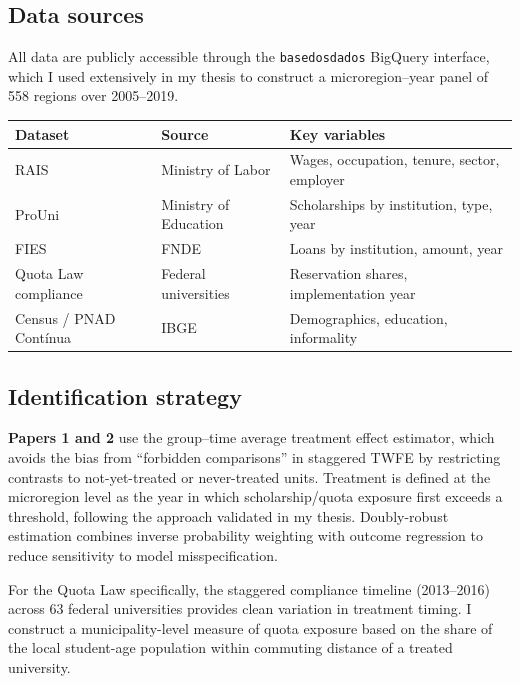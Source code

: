 \documentclass[a4paper,11pt]{article}
\begin{document}
\subsection{Data sources}

All data are publicly accessible through the \texttt{basedosdados} BigQuery interface, which I used extensively in my thesis to construct a microregion--year panel of 558 regions over 2005--2019.

\begin{table}[h]
\centering
\small
\begin{tabular}{@{}lll@{}}
\toprule
\textbf{Dataset} & \textbf{Source} & \textbf{Key variables} \\
\midrule
RAIS & Ministry of Labor & Wages, occupation, tenure, sector, employer \\
ProUni & Ministry of Education & Scholarships by institution, type, year \\
FIES & FNDE & Loans by institution, amount, year \\
Quota Law compliance & Federal universities & Reservation shares, implementation year \\
Census / PNAD Cont\'inua & IBGE & Demographics, education, informality \\
\bottomrule
\end{tabular}
\end{table}

\subsection{Identification strategy}

\textbf{Papers 1 and 2} use the \citet{callaway2021} group--time average treatment effect estimator, which avoids the bias from ``forbidden comparisons'' in staggered TWFE by restricting contrasts to not-yet-treated or never-treated units. Treatment is defined at the microregion level as the year in which scholarship/quota exposure first exceeds a threshold, following the approach validated in my thesis. Doubly-robust estimation combines inverse probability weighting with outcome regression to reduce sensitivity to model misspecification.

For the Quota Law specifically, the staggered compliance timeline (2013--2016) across 63 federal universities provides clean variation in treatment timing. I construct a municipality-level measure of quota exposure based on the share of the local student-age population within commuting distance of a treated university.
\end{document}
